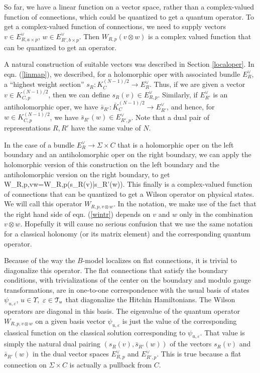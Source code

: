 \documentclass[11pt,a4paper]{article}
\begin{document}
So far, we have a linear function on a vector space, rather than a complex-valued function of connections, which could be quantized to get a quantum
operator.   To get a complex-valued function of connections, we need to supply vectors $v\in E^\vee_{R,a\times p}$, $w\in E^\vee_{R',b\times p}$.
Then $W_{R,p}(v\otimes w)$ is a complex valued function that can be quantized to get an operator.   

A natural construction of suitable vectors was described in Section \ref{localoper}.   In eqn. (\ref{linmap}), we described, for a holomorphic
oper with associated bundle $E^\vee_R$, a ``highest weight section'' $s_R:K_C^{(N-1)/2}\to E^\vee_R$.   Thus, if we are given a vector
$v\in K_{C,p}^{(N-1)/2}$, then we can define $s_R(v)\in E^\vee_{R,p}$.    Similarly, if $E^\vee_{R'}$ is an antiholomorphic oper, we have
$\bar s_{R'}:\bar K_C^{(N-1)/2}\to E^\vee_{R'}$, and hence, for $w\in K_{C,p}^{(N-1)/2}$, we have $\bar s_{R'}(w)\in E^\vee_{R',p}$.  Note
that a dual pair of representations $R,R'$ have the same value of $N$.

In the case of a bundle  $E^\vee_R\to \Sigma\times C$ that is a holomorphic oper on the left boundary and an antiholomorphic oper on the right
boundary, we can apply the holomorphic version of this construction on the left boundary and the antiholomorphic version on the right boundary, to get
\be\label{wintr}W_{R,p,v\otimes w}=W_{R,p}(s_{R}(v)\otimes \bar s_{R'}(w)). \ee
This finally is a complex-valued function of connections that can be quantized to get a Wilson operator on physical states.  We will call this
operator $W_{R,p,v\otimes w}$.   In the notation, we make use of the fact that the right hand side of eqn. (\ref{wintr}) depends on $v$ and $w$ only in the
combination $v\otimes w$.     Hopefully it will cause no serious confusion that we use the same notation for a classical holonomy (or its matrix element)
and the corresponding quantum operator.  

Because of the way the $B$-model localizes on flat connections, it is trivial to diagonalize this operator.   The flat connections that satisfy the boundary
conditions, with trivializations of the center on the boundary and modulo gauge transformations, are in one-to-one correspondence with 
 the usual basis of states $\psi_{u,\varepsilon}$, $u\in\Upsilon,$ $\varepsilon\in {\mathcal T}_u$ that diagonalize the Hitchin Hamiltonians.   
 The Wilson operators are diagonal in this basis.
  The eigenvalue of the quantum operator $ W_{R,p,v\otimes w}$ on a given
basis vector $\psi_{u,\varepsilon}$ is just the value of the  corresponding classical function  on the classical solution corresponding to $\psi_{u,\varepsilon}$.   That value
is simply the natural dual pairing $(s_R(v), \bar s_{R'}(w))$ of the vectors $s_{R}(v)$ and $\bar s_{R'}(w)$ in the dual vector spaces $E^\vee_{R,p}$ and
$E^\vee_{R',p}$.     This is true because a flat connection on $\Sigma\times C$ is actually a pullback from $C$.
\end{document}
